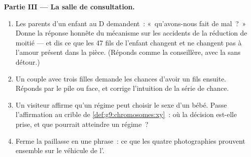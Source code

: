 \begin{problem}
\medskip\noindent\textbf{Partie III --- La salle de
consultation.}
\begin{enumerate}[resume]
  \item Les parents d'un enfant au  D demandent~:
        «~qu'avons-nous fait de mal~?~» Donne la réponse
        honnête du mécanisme sur les accidents de la
        réduction de moitié --- et dis ce que les 47 fils
        de l'enfant changent et ne changent pas à l'amour
        présent dans la pièce. (Réponds comme la
        conseillère, avec la  sans détour.)
  \item Un couple avec trois filles demande les chances
        d'avoir un fils ensuite. Réponds par le pile ou
        face, et corrige l'intuition de la série de chance.
  \item Un visiteur affirme qu'un régime peut choisir le
        sexe d'un bébé. Passe l'affirmation au crible de
        \cref{def:g9:chromosomes:xy}~: où la décision
        est-elle prise, et que pourrait atteindre un
        régime~?
  \item Ferme la paillasse en une phrase~: ce que les
        quatre photographies prouvent ensemble sur le
        véhicule de l'.
\end{enumerate}
\end{problem}
